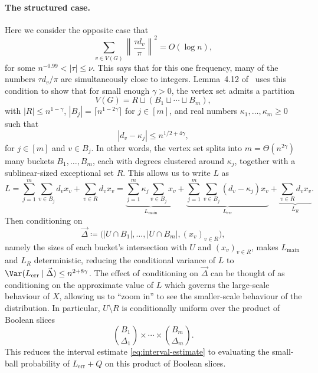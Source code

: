 \paragraph{The structured case.} Here we consider the opposite case that
\[
  \sum_{v \in V(G)} \left\|\frac{\tau d_v}{\pi}\right\|^2 = O(\log n),
\]
for some $n^{-0.99} < |\tau| \leq \nu$. This says that for this one frequency, many of the numbers $\tau d_v/\pi$ are simultaneously close to integers. Lemma~4.12 of~\cite{Kwan_2023} uses this condition to show that for small enough $\gamma > 0$, the vertex set admits a partition
\begin{equation}
  \label{eq:partition}
  V(G) = R \sqcup (B_1 \sqcup \cdots \sqcup B_m),
\end{equation}
with $|R| \leq n^{1-\gamma}$, $|B_j| = \lceil n^{1-2\gamma}\rceil$ for $j \in [m]$, and real numbers $\kappa_1, \dots, \kappa_m \geq 0$ such that
\[
  |d_v - \kappa_j| \leq n^{1/2 + 4\gamma},
\]
for $j \in [m]$ and $v \in B_j$. In other words, the vertex set splits into $m = \Theta(n^{2\gamma})$ many buckets $B_1, \dots, B_m$, each with degrees clustered around $\kappa_j$, together with a sublinear-sized exceptional set $R$. This allows us to write $L$ as
\[
 L = \sum_{j = 1}^m \sum_{v \in B_j} d_vx_v + \sum_{v \in R} d_v x_v = \underbrace{\sum_{j = 1}^m \kappa_j \sum_{v \in B_j} x_v}_{L_{\text{main}}} + \underbrace{\sum_{j = 1}^m \sum_{v \in B_j} (d_v - \kappa_j)x_v}_{L_{\text{err}}} + \underbrace{\sum_{v \in R} d_v x_v}_{L_{R}}.
\]
Then conditioning on
\[
  \vec\Delta \coloneqq \bigl(|U \cap B_1|, \dots, |U \cap B_m|, (x_v)_{v \in R}\bigr),
\]
namely the sizes of each bucket's intersection with $U$ and $(x_v)_{v \in R}$, makes $L_{\text{main}}$ and $L_{R}$ deterministic, reducing the conditional variance of $L$ to $\Var(L_{\text{err}} \mid \vec\Delta) \leq n^{2 + 8\gamma}$. The effect of conditioning on $\vec\Delta$ can be thought of as conditioning on the approximate value of $L$ which governs the large-scale behaviour of $X$, allowing us to ``zoom in'' to see the smaller-scale behaviour of the distribution. In particular, $U \setminus R$ is conditionally uniform over the product of Boolean slices
\[
  \binom{B_1}{\Delta_1} \times \cdots \times \binom{B_m}{\Delta_m}.
\]
This reduces the interval estimate \eqref{eq:interval-estimate} to evaluating the small-ball probability of $L_{\text{err}} + Q$ on this product of Boolean slices.

